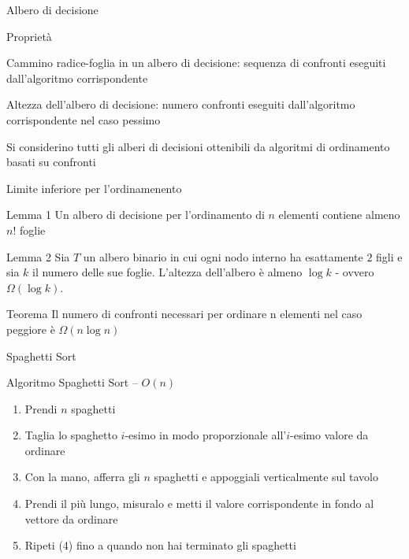 \begin{frame}{Albero di decisione}
	
\begin{block}{Proprietà}
\BI
\item \alert{Cammino radice-foglia in un albero di decisione}: sequenza di confronti eseguiti dall'algoritmo corrispondente
\item \alert{Altezza dell'albero di decisione}: numero confronti eseguiti dall'algoritmo corrispondente nel caso pessimo
\EI
\end{block}

\bigskip
Si considerino tutti gli alberi di decisioni ottenibili da algoritmi di ordinamento basati su confronti

\end{frame}%

\begin{frame}{Limite inferiore per l'ordinamenento}

\begin{block}{Lemma 1}
Un albero di decisione per l'ordinamento di $n$ elementi contiene almeno $n!$ foglie
\end{block}

\begin{block}{Lemma 2}
Sia $T$ un albero binario in cui ogni nodo interno ha esattamente $2$ figli e sia $k$ il numero delle sue foglie. 
L'altezza dell'albero è almeno $\log k$ - ovvero $\Omega(\log k)$.
\end{block}

\begin{block}{Teorema}
Il numero di confronti necessari per ordinare n elementi nel caso peggiore è $\Omega(n \log n)$
\end{block}

\end{frame}%


\begin{frame}{Spaghetti Sort}

\begin{block}{Algoritmo Spaghetti Sort -- $O(n)$}
\begin{enumerate}
\item Prendi $n$ spaghetti
\item Taglia lo spaghetto $i$-esimo in modo proporzionale all'$i$-esimo valore da ordinare
\item Con la mano, afferra gli $n$ spaghetti e appoggiali verticalmente sul tavolo
\item Prendi il più lungo, misuralo e metti il valore corrispondente in fondo al vettore da ordinare
\item Ripeti (4) fino a quando non hai terminato gli spaghetti
\end{enumerate}
\end{block}
\end{frame}%

